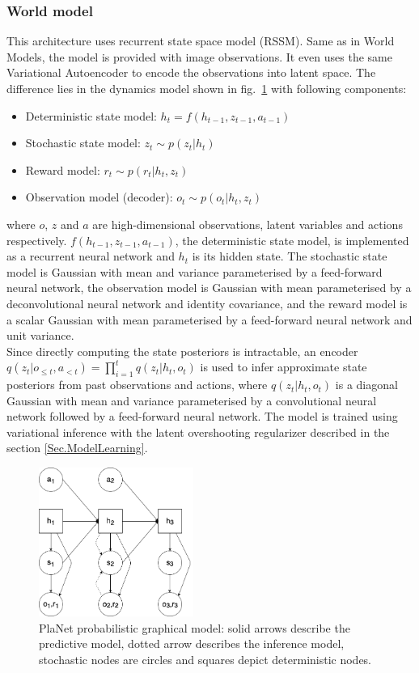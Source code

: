 \subsubsection{World model}

This architecture uses recurrent state space model (RSSM). Same as in World Models, the model is provided with image observations. It even uses the same Variational Autoencoder to encode the observations into latent space. The difference lies in the dynamics model shown in fig.~\ref{Fig.PlaNetPGM} with following components:
\begin{itemize}
\item Deterministic state model:             $h_t = f(h_{t-1}, z_{t-1}, a_{t-1})$
\item Stochastic state model:                $z_t \sim p(z_t|h_t)$
\item Reward model:                          $r_t \sim p(r_t|h_t, z_t)$
\item Observation model (decoder):           $o_t \sim p(o_t|h_t, z_t)$
\end{itemize}
where $o$, $z$ and $a$ are high-dimensional observations, latent variables and actions respectively. $f(h_{t-1}, z_{t-1}, a_{t-1})$, the deterministic state model, is implemented as a recurrent neural network and $h_t$ is its hidden state. The stochastic state model is Gaussian with mean and variance parameterised by a feed-forward neural network, the observation model is Gaussian with mean parameterised by a deconvolutional neural network and identity covariance, and the reward model is a scalar Gaussian with mean parameterised by a feed-forward neural network and unit variance. \\
Since directly computing the state posteriors is intractable, an encoder $q(z_t|o_{\leqslant t}, a_{< t}) = \prod_{i=1}^tq(z_t|h_t,o_t)$ is used to infer approximate state posteriors from past observations and actions, where $q(z_t | h_t, o_t)$ is a diagonal Gaussian with mean and variance parameterised by a convolutional neural network followed by a feed-forward neural network. The model is trained using variational inference with the latent overshooting regularizer described in the section \ref{Sec.ModelLearning}.

\begin{figure}[H]
\includegraphics[width=0.45\textwidth,keepaspectratio]{figures/PlaNet/prob_graph_model.png}
\caption[World Models probabilistic graphical model]{PlaNet probabilistic graphical model: solid arrows describe the predictive model, dotted arrow describes the inference model, stochastic nodes are circles and squares depict deterministic nodes.}
\label{Fig.PlaNetPGM}
\end{figure}

